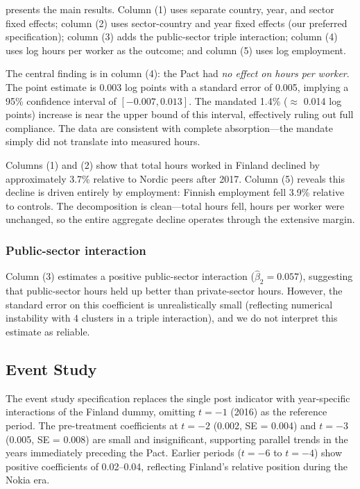 \documentclass[12pt]{article}
\begin{document}
 presents the main results. Column (1) uses separate country, year, and sector fixed effects; column (2) uses sector-country and year fixed effects (our preferred specification); column (3) adds the public-sector triple interaction; column (4) uses log hours per worker as the outcome; and column (5) uses log employment.



The central finding is in column (4): the Pact had \textit{no effect on hours per worker}. The point estimate is 0.003 log points with a standard error of 0.005, implying a 95\% confidence interval of $[-0.007, 0.013]$. The mandated 1.4\% ($\approx$ 0.014 log points) increase is near the upper bound of this interval, effectively ruling out full compliance. The data are consistent with complete absorption---the mandate simply did not translate into measured hours.

Columns (1) and (2) show that total hours worked in Finland declined by approximately 3.7\% relative to Nordic peers after 2017. Column (5) reveals this decline is driven entirely by employment: Finnish employment fell 3.9\% relative to controls. The decomposition is clean---total hours fell, hours per worker were unchanged, so the entire aggregate decline operates through the extensive margin.

\subsubsection*{Public-sector interaction} Column (3) estimates a positive public-sector interaction ($\hat{\beta}_2 = 0.057$), suggesting that public-sector hours held up better than private-sector hours. However, the standard error on this coefficient is unrealistically small (reflecting numerical instability with 4 clusters in a triple interaction), and we do not interpret this estimate as reliable.

\subsection{Event Study}

The event study specification replaces the single post indicator with year-specific interactions of the Finland dummy, omitting $t = -1$ (2016) as the reference period. The pre-treatment coefficients at $t = -2$ (0.002, SE = 0.004) and $t = -3$ (0.005, SE = 0.008) are small and insignificant, supporting parallel trends in the years immediately preceding the Pact. Earlier periods ($t = -6$ to $t = -4$) show positive coefficients of 0.02--0.04, reflecting Finland's relative position during the Nokia era.
\end{document}
